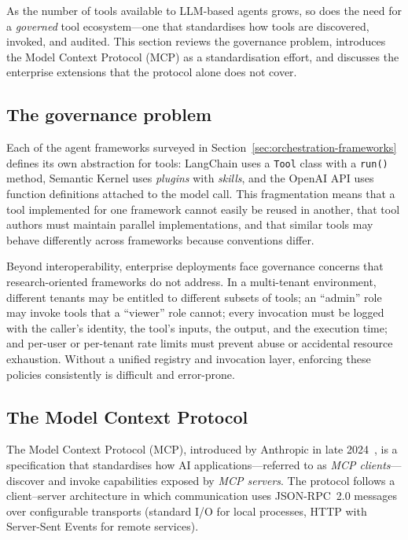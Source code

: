 \documentclass[a4paper,noexaminfo]{sapthesis}
\begin{document}
As the number of tools available to LLM-based agents grows, so does the
need for a \emph{governed} tool ecosystem---one that standardises how tools
are discovered, invoked, and audited.  This section reviews the governance
problem, introduces the Model Context Protocol (MCP) as a standardisation
effort, and discusses the enterprise extensions that the protocol alone does
not cover.

\subsection{The governance problem}

Each of the agent frameworks surveyed in Section~\ref{sec:orchestration-frameworks}
defines its own abstraction for tools: LangChain uses a \texttt{Tool} class
with a \texttt{run()} method, Semantic Kernel uses \emph{plugins} with
\emph{skills}, and the OpenAI API uses function definitions attached to
the model call.  This fragmentation means that a tool implemented for one
framework cannot easily be reused in another, that tool authors must
maintain parallel implementations, and that similar tools may behave
differently across frameworks because conventions differ.

Beyond interoperability, enterprise deployments face governance concerns
that research-oriented frameworks do not address.  In a multi-tenant
environment, different tenants may be entitled to different subsets of
tools; an ``admin'' role may invoke tools that a ``viewer'' role cannot;
every invocation must be logged with the caller's identity, the tool's
inputs, the output, and the execution time; and per-user or per-tenant
rate limits must prevent abuse or accidental resource exhaustion.  Without
a unified registry and invocation layer, enforcing these policies
consistently is difficult and error-prone.

\subsection{The Model Context Protocol}

The Model Context Protocol (MCP), introduced by Anthropic in late
2024~\cite{anthropic2024mcp}, is a specification that standardises how
AI applications---referred to as \emph{MCP clients}---discover and invoke
capabilities exposed by \emph{MCP servers}.  The protocol follows a
client--server architecture in which communication uses JSON-RPC~2.0
messages over configurable transports (standard I/O for local processes,
HTTP with Server-Sent Events for remote services).
\end{document}
